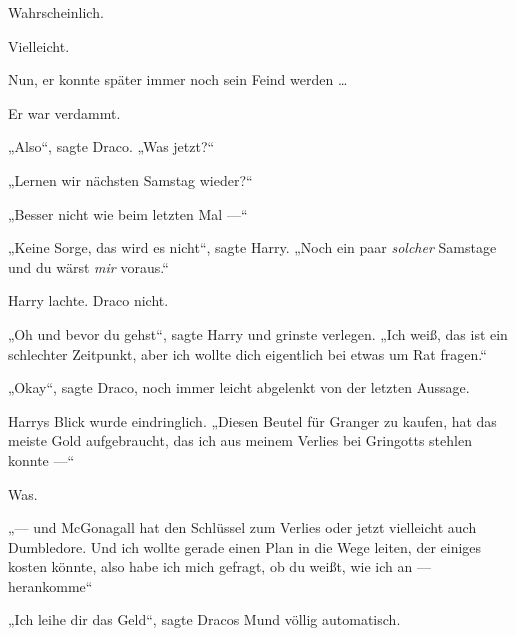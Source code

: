 Wahrscheinlich.

Vielleicht.

Nun, er konnte später immer noch sein Feind werden …

Er war verdammt.

„Also“, sagte Draco.
„Was jetzt?“

„Lernen wir nächsten Samstag wieder?“

„Besser nicht wie beim letzten Mal —“

„Keine Sorge, das wird es nicht“, sagte Harry.
„Noch ein paar \emph{solcher} Samstage und du wärst \emph{mir} voraus.“

Harry lachte. Draco nicht.

„Oh und bevor du gehst“, sagte Harry und grinste verlegen.
„Ich weiß, das ist ein schlechter Zeitpunkt, aber ich wollte dich eigentlich bei etwas um Rat fragen.“

„Okay“, sagte Draco, noch immer leicht abgelenkt von der letzten Aussage.

Harrys Blick wurde eindringlich.
„Diesen Beutel für Granger zu kaufen, hat das meiste Gold aufgebraucht, das ich aus meinem Verlies bei Gringotts stehlen konnte —“

Was.

„— und McGonagall hat den Schlüssel zum Verlies oder jetzt vielleicht auch Dumbledore. Und ich wollte gerade einen Plan in die Wege leiten, der einiges kosten könnte, also habe ich mich gefragt, ob du weißt, wie ich an — herankomme“

„Ich leihe dir das Geld“, sagte Dracos Mund völlig automatisch.

